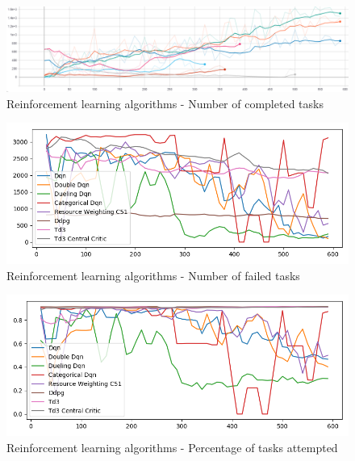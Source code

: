 \begin{figure}[H]
    \centering
    \includegraphics[width=\linewidth]{figures/5_evaluation_figs/algo_training_fig/num_completed_tasks.PNG}
    \caption{Reinforcement learning algorithms - Number of completed tasks}
    \label{fig:algo_num_completed_tasks}
\end{figure}

\begin{figure}[H]
    \centering
    \includegraphics[width=\linewidth]{figures/5_evaluation_figs/algo_training_fig/num_failed_tasks.png}
    \caption{Reinforcement learning algorithms - Number of failed tasks}
    \label{fig:algo_num_failed_tasks}
\end{figure}

\begin{figure}[H]
    \centering
    \includegraphics[width=\linewidth]{figures/5_evaluation_figs/algo_training_fig/percent_tasks.png}
    \caption{Reinforcement learning algorithms - Percentage of tasks attempted}
    \label{fig:algo_percent_tasks}
\end{figure}

